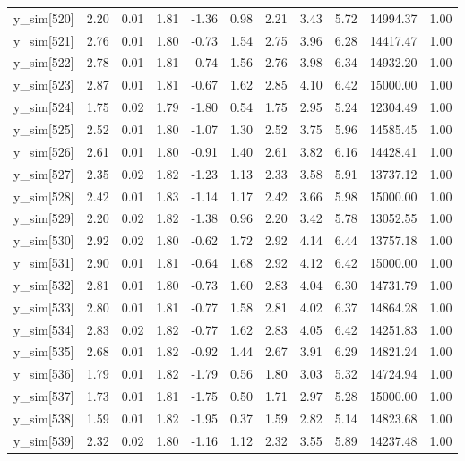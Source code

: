 \begin{table}[ht]
\begin{tabular}{rrrrrrrrrrr}
  y\_sim[520] & 2.20 & 0.01 & 1.81 & -1.36 & 0.98 & 2.21 & 3.43 & 5.72 & 14994.37 & 1.00 \\ 
  y\_sim[521] & 2.76 & 0.01 & 1.80 & -0.73 & 1.54 & 2.75 & 3.96 & 6.28 & 14417.47 & 1.00 \\ 
  y\_sim[522] & 2.78 & 0.01 & 1.81 & -0.74 & 1.56 & 2.76 & 3.98 & 6.34 & 14932.20 & 1.00 \\ 
  y\_sim[523] & 2.87 & 0.01 & 1.81 & -0.67 & 1.62 & 2.85 & 4.10 & 6.42 & 15000.00 & 1.00 \\ 
  y\_sim[524] & 1.75 & 0.02 & 1.79 & -1.80 & 0.54 & 1.75 & 2.95 & 5.24 & 12304.49 & 1.00 \\ 
  y\_sim[525] & 2.52 & 0.01 & 1.80 & -1.07 & 1.30 & 2.52 & 3.75 & 5.96 & 14585.45 & 1.00 \\ 
  y\_sim[526] & 2.61 & 0.01 & 1.80 & -0.91 & 1.40 & 2.61 & 3.82 & 6.16 & 14428.41 & 1.00 \\ 
  y\_sim[527] & 2.35 & 0.02 & 1.82 & -1.23 & 1.13 & 2.33 & 3.58 & 5.91 & 13737.12 & 1.00 \\ 
  y\_sim[528] & 2.42 & 0.01 & 1.83 & -1.14 & 1.17 & 2.42 & 3.66 & 5.98 & 15000.00 & 1.00 \\ 
  y\_sim[529] & 2.20 & 0.02 & 1.82 & -1.38 & 0.96 & 2.20 & 3.42 & 5.78 & 13052.55 & 1.00 \\ 
  y\_sim[530] & 2.92 & 0.02 & 1.80 & -0.62 & 1.72 & 2.92 & 4.14 & 6.44 & 13757.18 & 1.00 \\ 
  y\_sim[531] & 2.90 & 0.01 & 1.81 & -0.64 & 1.68 & 2.92 & 4.12 & 6.42 & 15000.00 & 1.00 \\ 
  y\_sim[532] & 2.81 & 0.01 & 1.80 & -0.73 & 1.60 & 2.83 & 4.04 & 6.30 & 14731.79 & 1.00 \\ 
  y\_sim[533] & 2.80 & 0.01 & 1.81 & -0.77 & 1.58 & 2.81 & 4.02 & 6.37 & 14864.28 & 1.00 \\ 
  y\_sim[534] & 2.83 & 0.02 & 1.82 & -0.77 & 1.62 & 2.83 & 4.05 & 6.42 & 14251.83 & 1.00 \\ 
  y\_sim[535] & 2.68 & 0.01 & 1.82 & -0.92 & 1.44 & 2.67 & 3.91 & 6.29 & 14821.24 & 1.00 \\ 
  y\_sim[536] & 1.79 & 0.01 & 1.82 & -1.79 & 0.56 & 1.80 & 3.03 & 5.32 & 14724.94 & 1.00 \\ 
  y\_sim[537] & 1.73 & 0.01 & 1.81 & -1.75 & 0.50 & 1.71 & 2.97 & 5.28 & 15000.00 & 1.00 \\ 
  y\_sim[538] & 1.59 & 0.01 & 1.82 & -1.95 & 0.37 & 1.59 & 2.82 & 5.14 & 14823.68 & 1.00 \\ 
  y\_sim[539] & 2.32 & 0.02 & 1.80 & -1.16 & 1.12 & 2.32 & 3.55 & 5.89 & 14237.48 & 1.00 \\ 

\end{tabular}
\end{table}
